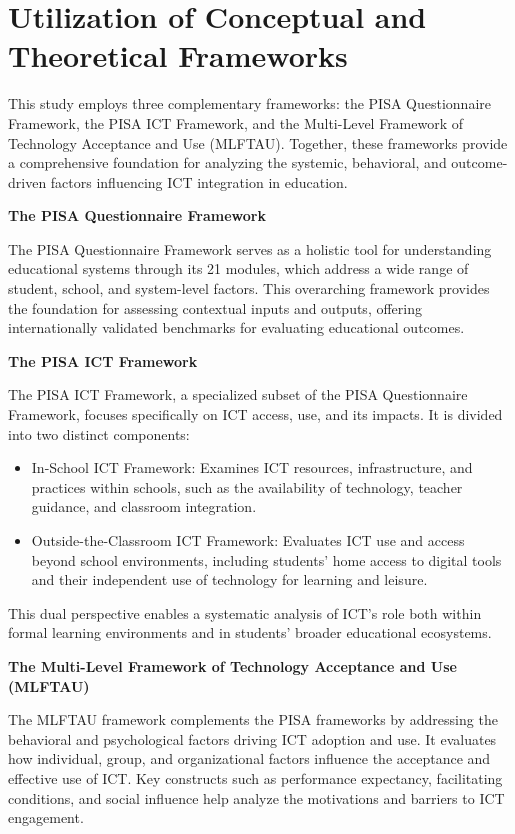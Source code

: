 \documentclass[
]{article}
\begin{document}
\hypertarget{utilization-of-conceptual-and-theoretical-frameworks}{%
\section{Utilization of Conceptual and Theoretical
Frameworks}\label{utilization-of-conceptual-and-theoretical-frameworks}}

This study employs three complementary frameworks: the PISA
Questionnaire Framework, the PISA ICT Framework, and the Multi-Level
Framework of Technology Acceptance and Use (MLFTAU). Together, these
frameworks provide a comprehensive foundation for analyzing the
systemic, behavioral, and outcome-driven factors influencing ICT
integration in education.

\textbf{The PISA Questionnaire Framework}

The PISA Questionnaire Framework serves as a holistic tool for
understanding educational systems through its 21 modules, which address
a wide range of student, school, and system-level factors. This
overarching framework provides the foundation for assessing contextual
inputs and outputs, offering internationally validated benchmarks for
evaluating educational outcomes.

\textbf{The PISA ICT Framework}

The PISA ICT Framework, a specialized subset of the PISA Questionnaire
Framework, focuses specifically on ICT access, use, and its impacts. It
is divided into two distinct components:

\begin{itemize}
\item
  In-School ICT Framework: Examines ICT resources, infrastructure, and
  practices within schools, such as the availability of technology,
  teacher guidance, and classroom integration.
\item
  Outside-the-Classroom ICT Framework: Evaluates ICT use and access
  beyond school environments, including students' home access to digital
  tools and their independent use of technology for learning and
  leisure.
\end{itemize}

This dual perspective enables a systematic analysis of ICT's role both
within formal learning environments and in students' broader educational
ecosystems.

\textbf{The Multi-Level Framework of Technology Acceptance and Use
(MLFTAU)}

The MLFTAU framework complements the PISA frameworks by addressing the
behavioral and psychological factors driving ICT adoption and use. It
evaluates how individual, group, and organizational factors influence
the acceptance and effective use of ICT. Key constructs such as
performance expectancy, facilitating conditions, and social influence
help analyze the motivations and barriers to ICT engagement.
\end{document}
